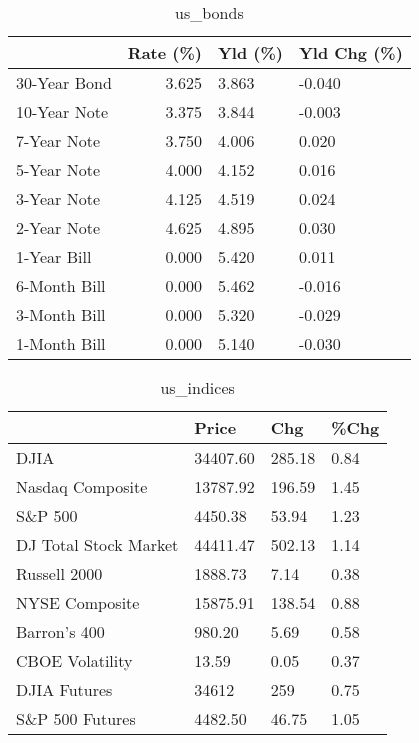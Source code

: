 \documentclass{article}%
\begin{document}
%


\begin{table}[htbp]%
\caption{us\_bonds}%
\centering%
\begin{adjustbox}{width=1\textwidth}%
\begin{tabular}{lrll}
\toprule
             &  Rate (\%) & Yld (\%) & Yld Chg (\%) \\
\midrule
30-Year Bond &     3.625 &   3.863 &      -0.040 \\
10-Year Note &     3.375 &   3.844 &      -0.003 \\
 7-Year Note &     3.750 &   4.006 &       0.020 \\
 5-Year Note &     4.000 &   4.152 &       0.016 \\
 3-Year Note &     4.125 &   4.519 &       0.024 \\
 2-Year Note &     4.625 &   4.895 &       0.030 \\
 1-Year Bill &     0.000 &   5.420 &       0.011 \\
6-Month Bill &     0.000 &   5.462 &      -0.016 \\
3-Month Bill &     0.000 &   5.320 &      -0.029 \\
1-Month Bill &     0.000 &   5.140 &      -0.030 \\
\bottomrule
\end{tabular}
%
\end{adjustbox}%
\end{table}

%


\begin{table}[htbp]%
\caption{us\_indices}%
\centering%
\begin{adjustbox}{width=1\textwidth}%
\begin{tabular}{llll}
\toprule
                      &    Price &    Chg & \%Chg \\
\midrule
                 DJIA & 34407.60 & 285.18 & 0.84 \\
     Nasdaq Composite & 13787.92 & 196.59 & 1.45 \\
              S\&P 500 &  4450.38 &  53.94 & 1.23 \\
DJ Total Stock Market & 44411.47 & 502.13 & 1.14 \\
         Russell 2000 &  1888.73 &   7.14 & 0.38 \\
       NYSE Composite & 15875.91 & 138.54 & 0.88 \\
         Barron's 400 &   980.20 &   5.69 & 0.58 \\
      CBOE Volatility &    13.59 &   0.05 & 0.37 \\
         DJIA Futures &    34612 &    259 & 0.75 \\
      S\&P 500 Futures &  4482.50 &  46.75 & 1.05 \\
\bottomrule
\end{tabular}
%
\end{adjustbox}%
\end{table}
\end{document}
